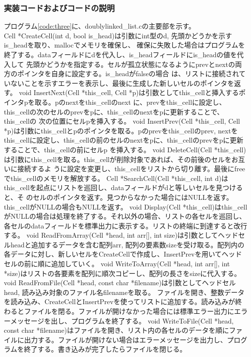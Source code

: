 \documentclass{ltjsarticle}
\begin{document}
\subsubsection{実装コードおよびコードの説明}\label{subsubsec:実装コードおよびコードの説明3}
プログラム\ref{code:three}に、doublylinked\_list.cの主要部を示す。\\ \indent
Cell *CreateCell(int d, bool is\_head)は引数にint型のd, 先頭かどうかを示すis\_headを取り、mallocでメモリを確保し、
確保に失敗した場合はプログラムを終了する。dataフィールドにdを代入し、is\_headフィールドにis\_headの値を代入して
先頭かどうかを指定する。セルが孤立状態になるようにprevとnextの両方のポインタを自身に設定する。is\_headがfalseの場合
は、リストに接続されていないことを示すエラーを表示し、最後に生成した新しいセルのポインタを返す。
void InsertNext(Cell *this\_cell, Cell *p)は引数としてthis\_cellと挿入するポインタpを取る。pのnextをthis\_cellのnext
に、prevをthis\_cellに設定し、this\_cellの次のセルのprevをpに、this\_cellのnextをpに更新することで、this\_cellの
次の位置にセルpを挿入する。
void InsertPrev(Cell *this\_cell, Cell *p)は引数にthis\_cellとpのポインタを取る。pのprevをthis\_cellのprev, 
nextをthis\_cellに設定し、this\_cellの前のセルのnextをpに、this\_cellのprevをpに更新することで、this\_cellの前にセルp
を挿入する。
void DeleteCell(Cell *this\_cell)は引数にthis\_cellを取る。this\_cellが削除対象であれば、その前後のセルをお互いに接続するよ
うに設定を変更し、this\_cellをリストから切り離す。最後にfreeでthis\_cellのメモリを解放する。
Cell *SearchCell(Cell *this\_cell, int d)はthis\_cellを起点にリストを巡回し、dataフィールドがdと等しいセルを見つけると、そ
のセルのポインタを返す。見つからなかった場合にはNULLを返す。this\_cellがNULLの場合もNULLを返す。
void Display(Cell *this\_cell)はthis\_cellがNULLの場合は処理を終了する。それ以外の場合、リストの各セルを巡回し、各セルのdataフィールドを標準出力に表示する。リストの終端に到達すると改行する。
void ReadFromArray(Cell *head, int arr[], int size)は引数としてヘッドセルheadと追加するデータを含む配列arr, 配列の要素数sizeを受け取る。配列内の各データに対し、新しいセルをCreateCellで作成し、InsertPrevを用いてヘッドセルの前に順に追加していく。
void WriteToArray(Cell *head, int arr[], int *size)はリストの各要素を配列に順次コピーし、配列の長さをsizeに代入する。
void ReadFromFile(Cell *head, const char *filename)は引数としてヘッドセルhead, 読み込み対象のファイル名filenameを取る。
ファイルを開き、整数データを読み込み、CreateCellとInsertPrevを使ってリストに追加する。読み込みが終わるとファイルを閉る。ファイルが開けなかった場合には標準エラー出力にエラーメッセージを出し、プログラムを終了する。
void WriteToFile(Cell *head, const char *filename)はファイルを開き、リスト内の各セルのデータを順にファイルに出力する。ファイルが開けない場合はエラーメッセージを出力し、プログラムを終了する。書き込みが完了したらファイルを閉じる。
\end{document}
